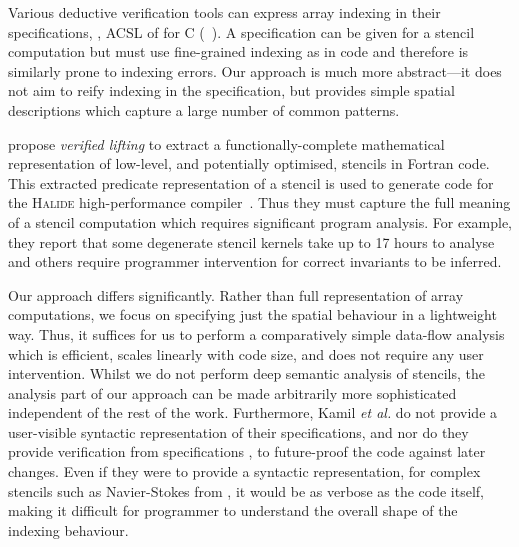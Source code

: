 \noindent
Various deductive verification tools can express array indexing in their
specifications, \eg{}, ACSL of \citet{baudin2008acsl} for C
(\eg{}~\citet[Example 3.4.1]{burghardt2010acsl}). A specification can be given
for a stencil computation but must use fine-grained indexing as in code and
therefore is similarly prone to indexing errors. Our approach is much more
abstract---it does not aim to reify indexing in the specification, but
provides simple spatial descriptions which capture a large number of common
patterns.

\citet{kamil2016verified} propose \emph{verified lifting} to extract a
functionally-complete mathematical representation of low-level, and potentially
optimised, stencils in Fortran code. This extracted predicate representation of
a stencil is used to generate code for the \textsc{Halide} high-performance
compiler~\citep{ragan2013halide}. Thus they must capture the full meaning of a
stencil computation which requires significant program analysis. For example,
they report that some degenerate stencil kernels take up to 17 hours to analyse
and others require programmer intervention for correct invariants to be
inferred.


Our approach differs significantly. Rather than full representation of
array computations, we focus on specifying just the spatial behaviour
in a lightweight way.  Thus, it suffices for us to perform a
comparatively simple data-flow analysis which is efficient, scales
linearly with code size, and does not require any user intervention.
Whilst we do not perform deep semantic analysis of stencils, the
analysis part of our approach can be made arbitrarily more
sophisticated independent of the rest of the work.
%
Furthermore, Kamil \emph{et al.} do not provide a user-visible syntactic
representation of their specifications, and nor do they provide verification
from specifications \eg{}, to future-proof the code against later changes. Even
if they were to provide a syntactic representation, for complex stencils such as
Navier-Stokes from , it would be as verbose as the code
itself, making it difficult for programmer to understand the overall shape of
the indexing behaviour.

